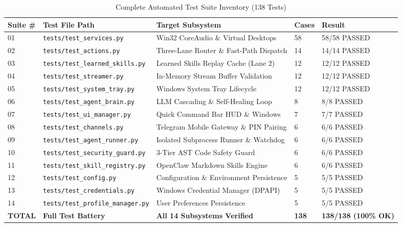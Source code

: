 \documentclass[12pt,letterpaper,oneside]{report}
\begin{document}
\begin{table}[H]
\centering
\caption{Complete Automated Test Suite Inventory (138 Tests)}
\label{tab:test_inventory}
\begin{tabularx}{\textwidth}{|l|l|X|l|l|}
\hline
\textbf{Suite \#} & \textbf{Test File Path} & \textbf{Target Subsystem} & \textbf{Cases} & \textbf{Result}\\ \hline
01 & \texttt{tests/test\_services.py} & Win32 CoreAudio \& Virtual Desktops & 58 & 58/58 PASSED\\ \hline
02 & \texttt{tests/test\_actions.py} & Three-Lane Router \& Fast-Path Dispatch & 14 & 14/14 PASSED\\ \hline
03 & \texttt{tests/test\_learned\_skills.py} & Learned Skills Replay Cache (Lane 2) & 12 & 12/12 PASSED\\ \hline
04 & \texttt{tests/test\_streamer.py} & In-Memory Stream Buffer Validation & 12 & 12/12 PASSED\\ \hline
05 & \texttt{tests/test\_system\_tray.py} & Windows System Tray Lifecycle & 12 & 12/12 PASSED\\ \hline
06 & \texttt{tests/test\_agent\_brain.py} & LLM Cascading \& Self-Healing Loop & 8 & 8/8 PASSED\\ \hline
07 & \texttt{tests/test\_ui\_manager.py} & Quick Command Bar HUD \& Windows & 7 & 7/7 PASSED\\ \hline
08 & \texttt{tests/test\_channels.py} & Telegram Mobile Gateway \& PIN Pairing & 6 & 6/6 PASSED\\ \hline
09 & \texttt{tests/test\_agent\_runner.py} & Isolated Subprocess Runner \& Watchdog & 6 & 6/6 PASSED\\ \hline
10 & \texttt{tests/test\_security\_guard.py} & 3-Tier AST Code Safety Guard & 6 & 6/6 PASSED\\ \hline
11 & \texttt{tests/test\_skill\_registry.py} & OpenClaw Markdown Skills Engine & 6 & 6/6 PASSED\\ \hline
12 & \texttt{tests/test\_config.py} & Configuration \& Environment Persistence & 5 & 5/5 PASSED\\ \hline
13 & \texttt{tests/test\_credentials.py} & Windows Credential Manager (DPAPI) & 5 & 5/5 PASSED\\ \hline
14 & \texttt{tests/test\_profile\_manager.py} & User Preferences Persistence & 5 & 5/5 PASSED\\ \hline
\textbf{TOTAL} & \textbf{Full Test Battery} & \textbf{All 14 Subsystems Verified} & \textbf{138} & \textbf{138/138 (100\% OK)}\\ \hline
\end{tabularx}
\end{table}
\end{document}

